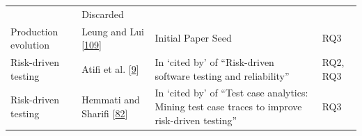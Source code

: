 \documentclass[]{book}
\begin{document}
\begin{longtable}[]{@{}llll@{}}
\begin{minipage}[t]{0.50\columnwidth}
\end{minipage} & \begin{minipage}[t]{0.04\columnwidth}\raggedright\strut
Discarded\strut
\end{minipage}\tabularnewline
\begin{minipage}[t]{0.18\columnwidth}\raggedright\strut
Production evolution\strut
\end{minipage} & \begin{minipage}[t]{0.16\columnwidth}\raggedright\strut
Leung and Lui {[}\protect\hyperlink{ref-leung2015testing}{109}{]}\strut
\end{minipage} & \begin{minipage}[t]{0.50\columnwidth}\raggedright\strut
Initial Paper Seed\strut
\end{minipage} & \begin{minipage}[t]{0.04\columnwidth}\raggedright\strut
RQ3\strut
\end{minipage}\tabularnewline
\begin{minipage}[t]{0.18\columnwidth}\raggedright\strut
Risk-driven testing\strut
\end{minipage} & \begin{minipage}[t]{0.16\columnwidth}\raggedright\strut
Atifi et al. {[}\protect\hyperlink{ref-atifi2017}{9}{]}\strut
\end{minipage} & \begin{minipage}[t]{0.50\columnwidth}\raggedright\strut
In `cited by' of ``Risk-driven software testing and reliability''\strut
\end{minipage} & \begin{minipage}[t]{0.04\columnwidth}\raggedright\strut
RQ2, RQ3\strut
\end{minipage}\tabularnewline
\begin{minipage}[t]{0.18\columnwidth}\raggedright\strut
Risk-driven testing\strut
\end{minipage} & \begin{minipage}[t]{0.16\columnwidth}\raggedright\strut
Hemmati and Sharifi {[}\protect\hyperlink{ref-hemmati2018}{82}{]}\strut
\end{minipage} & \begin{minipage}[t]{0.50\columnwidth}\raggedright\strut
In `cited by' of ``Test case analytics: Mining test case traces to
improve risk-driven testing''\strut
\end{minipage} & \begin{minipage}[t]{0.04\columnwidth}\raggedright\strut
RQ3\strut
\end{minipage}\tabularnewline

\end{longtable}
\end{document}
